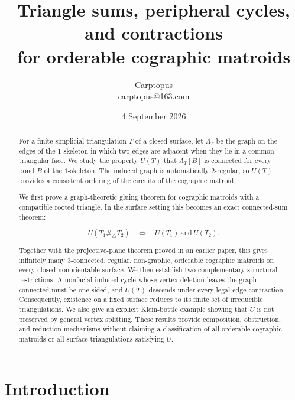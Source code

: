 \documentclass[11pt]{article}
\title{Triangle sums, peripheral cycles, and contractions\\
for orderable cographic matroids}
\author{Carptopus\\\href{mailto:carptopus@163.com}{carptopus@163.com}}
\date{4 September 2026}
\begin{document}
\maketitle

\begin{center}
\end{center}

\begin{abstract}


For a finite simplicial triangulation $T$ of a closed surface, let
$\Lambda_T$ be the graph on the edges of the $1$-skeleton in which two edges
are adjacent when they lie in a common triangular face. We study the property
$U(T)$ that $\Lambda_T[B]$ is connected for every bond $B$ of the
$1$-skeleton. The induced graph is automatically $2$-regular, so $U(T)$
provides a consistent ordering of the circuits of the cographic matroid.

We first prove a graph-theoretic gluing theorem for cographic matroids with a
compatible rooted triangle. In the surface setting this becomes an exact
connected-sum theorem:

\[
U(T_1\mathbin{\#_\triangle}T_2)
\quad\Longleftrightarrow\quad
U(T_1)\ \text{and}\ U(T_2).
\]

Together with the projective-plane theorem proved in an earlier paper, this
gives infinitely many $3$-connected, regular, non-graphic, orderable
cographic matroids on every closed nonorientable surface. We then establish
two complementary structural restrictions. A nonfacial induced cycle whose
vertex deletion leaves the graph connected must be one-sided, and $U(T)$
descends under every legal edge contraction. Consequently, existence on a
fixed surface reduces to its finite set of irreducible triangulations. We also
give an explicit Klein-bottle example showing that $U$ is not preserved by
general vertex splitting. These results provide composition, obstruction, and
reduction mechanisms without claiming a classification of all orderable
cographic matroids or all surface triangulations satisfying $U$.

\end{abstract}

\section{Introduction}
\end{document}
